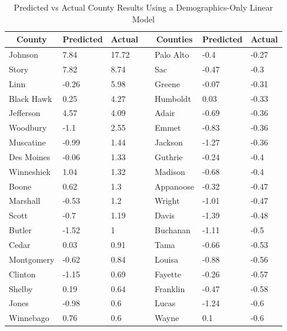 \documentclass[11pt]{article}
\begin{document}
\begin{table}[H]
\centering
\caption{Predicted vs Actual County Results Using a Demographics-Only Linear Model}
\small
\begin{tabular}{lllllll}
\multicolumn{1}{c}{\textbf{County}} & \multicolumn{1}{c}{\textbf{Predicted}} & \multicolumn{1}{c}{\textbf{Actual}} &  & \multicolumn{1}{c}{\textbf{Counties}} & \multicolumn{1}{c}{\textbf{Predicted}} & \multicolumn{1}{c}{\textbf{Actual}} \\ \toprule
Johnson       & 7.84      & 17.72  &  & Palo Alto  & -0.4      & -0.27  \\
Story         & 7.82      & 8.74   &  & Sac        & -0.47     & -0.3   \\
Linn          & -0.26     & 5.98   &  & Greene     & -0.07     & -0.31  \\
Black Hawk    & 0.25      & 4.27   &  & Humboldt   & 0.03      & -0.33  \\
Jefferson     & 4.57      & 4.09   &  & Adair      & -0.69     & -0.36  \\
Woodbury      & -1.1      & 2.55   &  & Emmet      & -0.83     & -0.36  \\
Muscatine     & -0.99     & 1.44   &  & Jackson    & -1.27     & -0.36  \\
Des Moines    & -0.06     & 1.33   &  & Guthrie    & -0.24     & -0.4   \\
Winneshiek    & 1.04      & 1.32   &  & Madison    & -0.68     & -0.4   \\
Boone         & 0.62      & 1.3    &  & Appanoose  & -0.32     & -0.47  \\
Marshall      & -0.53     & 1.2    &  & Wright     & -1.01     & -0.47  \\
Scott         & -0.7      & 1.19   &  & Davis      & -1.39     & -0.48  \\
Butler        & -1.52     & 1      &  & Buchanan   & -1.11     & -0.5   \\
Cedar         & 0.03      & 0.91   &  & Tama       & -0.66     & -0.53  \\
Montgomery    & -0.62     & 0.84   &  & Louisa     & -0.88     & -0.56  \\
Clinton       & -1.15     & 0.69   &  & Fayette    & -0.26     & -0.57  \\
Shelby        & 0.19      & 0.64   &  & Franklin   & -0.47     & -0.58  \\
Jones         & -0.98     & 0.6    &  & Lucas      & -1.24     & -0.6   \\
Winnebago     & 0.76      & 0.6    &  & Wayne      & 0.1       & -0.6   \\

\end{tabular}
\end{table}
\end{document}
